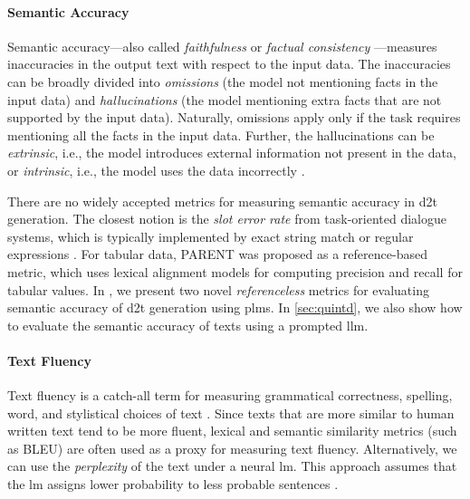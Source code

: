 {\paragraph{Semantic Accuracy} Semantic accuracy---also called \emph{faithfulness} or \emph{factual consistency} \cite{celikyilmazEvaluationTextGeneration2021}---measures inaccuracies in the output text with respect to the input data. The inaccuracies can be broadly divided into \emph{omissions} (the model not mentioning facts in the input data) and \emph{hallucinations} (the model mentioning extra facts that are not supported by the input data). Naturally, omissions apply only if the task requires mentioning all the facts in the input data. Further, the hallucinations can be \emph{extrinsic}, i.e., the model introduces external information not present in the data, or \emph{intrinsic}, i.e., the model uses the data incorrectly \cite{maynezFaithfulnessFactualityAbstractive2020}.

There are no widely accepted metrics for measuring semantic accuracy in \ac{d2t} generation. The closest notion is the \emph{slot error rate} from task-oriented dialogue systems, which is typically implemented by exact string match or regular expressions  \cite{wen2015semantically,dusekEvaluatingStateoftheartEndtoEnd2020}. For tabular data, PARENT \cite{dhingraHandlingDivergentReference2019} was proposed as a reference-based metric, which uses lexical alignment models for computing precision and recall for tabular values.  In , we present two novel \emph{referenceless} metrics for evaluating semantic accuracy of \ac{d2t} generation using \acp{plm}. In \autoref{sec:quintd}, we also show how to evaluate the semantic accuracy of texts using a prompted \ac{llm}.

\paragraph{Text Fluency} Text fluency is a catch-all term for measuring grammatical correctness, spelling, word, and stylistical choices of text \cite{celikyilmazEvaluationTextGeneration2021}. Since texts that are more similar to human written text tend to be more fluent, lexical and semantic similarity metrics (such as BLEU) are often used as a proxy for measuring text fluency. Alternatively, we can use the \emph{perplexity} of the text under a neural \ac{lm}. This approach assumes that the \ac{lm} assigns lower probability to less probable sentences \cite{leeFactualityEnhancedLanguage2022,kaneNUBIANeUralBased2020}.


}

